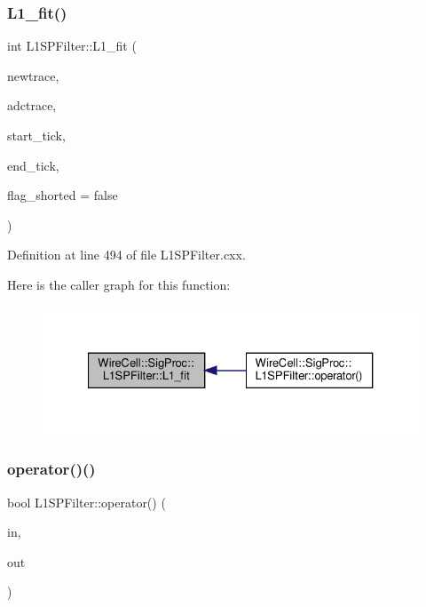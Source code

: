 \subsubsection{\texorpdfstring{L1\+\_\+fit()}{L1\_fit()}}
{\footnotesize\ttfamily int L1\+S\+P\+Filter\+::\+L1\+\_\+fit (\begin{DoxyParamCaption}\item[{std\+::shared\+\_\+ptr$<$ \hyperlink{class_wire_cell_1_1_simple_trace}{Wire\+Cell\+::\+Simple\+Trace} $>$ \&}]{newtrace,  }\item[{std\+::shared\+\_\+ptr$<$ const \hyperlink{class_wire_cell_1_1_i_trace}{Wire\+Cell\+::\+I\+Trace} $>$ \&}]{adctrace,  }\item[{int}]{start\+\_\+tick,  }\item[{int}]{end\+\_\+tick,  }\item[{bool}]{flag\+\_\+shorted = {\ttfamily false} }\end{DoxyParamCaption})}



Definition at line 494 of file L1\+S\+P\+Filter.\+cxx.

Here is the caller graph for this function\+:
\nopagebreak
\begin{figure}[H]
\begin{center}
\leavevmode
\includegraphics[width=327pt]{class_wire_cell_1_1_sig_proc_1_1_l1_s_p_filter_a9720ba99e84d3cb4df578eb7ee0e436d_icgraph}
\end{center}
\end{figure}
\mbox{\label{class_wire_cell_1_1_sig_proc_1_1_l1_s_p_filter_ac58397721b0a7b485d46ac63522ebe87}} 
\subsubsection{\texorpdfstring{operator()()}{operator()()}}
{\footnotesize\ttfamily bool L1\+S\+P\+Filter\+::operator() (\begin{DoxyParamCaption}\item[{const \hyperlink{class_wire_cell_1_1_i_function_node_a55c0946156df9b712b8ad1a0b59b2db6}{input\+\_\+pointer} \&}]{in,  }\item[{\hyperlink{class_wire_cell_1_1_i_function_node_afc02f1ec60d31aacddf64963f9ca650b}{output\+\_\+pointer} \&}]{out }\end{DoxyParamCaption})\hspace{0.3cm}{\ttfamily [virtual]}}




